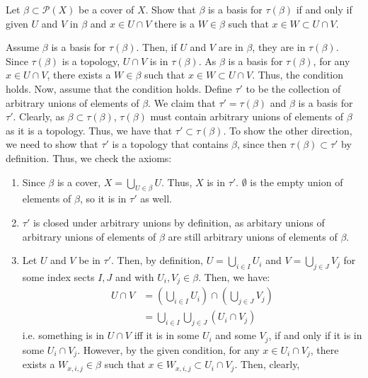 \documentclass[12pt]{article}
\begin{document}
\begin{problem}{44}
    Let $\beta \subset \mathcal{P}(X)$ be a cover of $X$. Show that $\beta$ is a basis for $\tau(\beta)$ if and only if given $U$ and $V$ in $\beta$ and $x \in U \cap V$ there is a $W \in \beta$ such that $x \in W \subset U \cap V$. 
\end{problem}
\begin{solution}
    Assume $\beta$ is a basis for $\tau(\beta)$. Then, if $U$ and $V$ are in $\beta$, they are in $\tau(\beta)$. Since $\tau(\beta)$ is a topology, $U \cap V$ is in $\tau(\beta)$. As $\beta$ is a basis for $\tau(\beta)$, for any $x \in U \cap V$, there exists a $W \in \beta$ such that $x \in W \subset U \cap V$. Thus, the condition holds. \bbni
    Now, assume that the condition holds. Define $\tau'$ to be the collection of arbitrary unions of elements of $\beta$. We claim that $\tau' = \tau(\beta)$ and $\beta$ is a basis for $\tau'$. Clearly, as $\beta \subset \tau(\beta)$, $\tau(\beta)$ must contain arbitrary unions of elements of $\beta$ as it is a topology. Thus, we have that $\tau' \subset \tau(\beta)$. \bbni
    To show the other direction, we need to show that $\tau'$ is a topology that contains $\beta$, since then $\tau(\beta) \subset \tau'$ by definition. Thus, we check the axioms: 
    \begin{enumerate}
        \item Since $\beta$ is a cover, $X = \bigcup_{U \in \beta} U$. Thus, $X$ is in $\tau'$. $\emptyset$ is the empty union of elements of $\beta$, so it is in $\tau'$ as well. 
        \item $\tau'$ is closed under arbitrary unions by definition, as arbitary unions of arbitrary unions of elements of $\beta$ are still arbitrary unions of elements of $\beta$.
        \item Let $U$ and $V$ be in $\tau'$. Then, by definition, $U = \bigcup_{i \in I} U_i$ and $V = \bigcup_{j \in J} V_j$ for some index sects $I, J$ and with $U_i, V_j \in \beta$. Then, we have:
        \begin{align*}
            U \cap V &= \left( \bigcup_{i \in I} U_i \right) \cap \left( \bigcup_{j \in J} V_j \right) \\
            &= \bigcup_{i \in I} \bigcup_{j \in J} (U_i \cap V_j)
        \end{align*}
        i.e. something is in $U \cap V$ iff it is in some $U_i$ and some $V_j$, if and only if it is in some $U_i \cap V_j$. However, by the given condition, for any $x \in U_i \cap V_j$, there exists a $W_{x, i, j} \in \beta$ such that $x \in W_{x, i, j} \subset U_i \cap V_j$. Then, clearly, 

\end{enumerate}
\end{solution}
\end{document}
